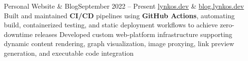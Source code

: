 
\subheading
    {Personal Website \& Blog}{September 2022 -- Present}
    {\href{https://lynkos.dev}{lynkos.dev} \& \href{https://blog.lynkos.dev}{blog.lynkos.dev}}{}
    \itemListStart
    \listItem{}
        {Built and maintained \textbf{CI/CD} pipelines using \textbf{GitHub Actions}, automating build, containerized testing, and static deployment workflows to achieve zero-downtime releases}
    \listItem{}
        {Developed custom web-platform infrastructure supporting dynamic content rendering, graph visualization, image proxying, link preview generation, and executable code integration}
    \itemListEnd